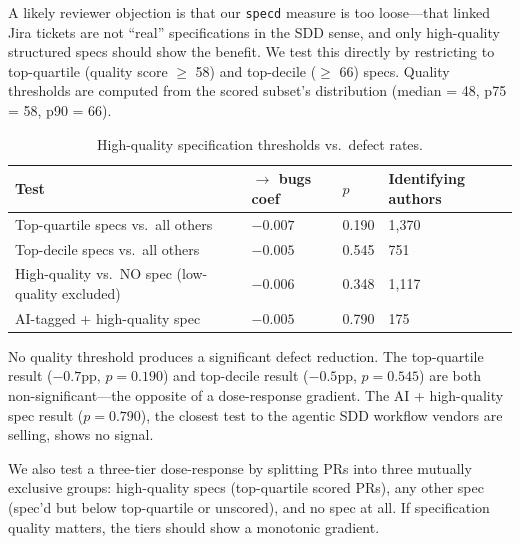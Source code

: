 \documentclass[a4paper,UKenglish,cleveref,autoref,thm-restate]{lipics-v2021}
\begin{document}
A likely reviewer objection is that our \texttt{specd} measure is too loose---that linked Jira tickets are not ``real'' specifications in the SDD sense, and only high-quality structured specs should show the benefit. We test this directly by restricting to top-quartile (quality score $\geq$ 58) and top-decile ($\geq$ 66) specs. Quality thresholds are computed from the scored subset's distribution (median = 48, p75 = 58, p90 = 66).

\begin{table}[t]
\centering
\caption{High-quality specification thresholds vs.\ defect rates.}
\label{tab:high-quality}
\begin{tabular}{@{}llll@{}}
\toprule
\textbf{Test} & \textbf{$\rightarrow$ bugs coef} & \textbf{$p$} & \textbf{Identifying authors} \\
\midrule
Top-quartile specs vs.\ all others & $-0.007$ & 0.190 & 1,370 \\
Top-decile specs vs.\ all others & $-0.005$ & 0.545 & 751 \\
High-quality vs.\ NO spec (low-quality excluded) & $-0.006$ & 0.348 & 1,117 \\
AI-tagged + high-quality spec & $-0.005$ & 0.790 & 175 \\
\bottomrule
\end{tabular}
\end{table}

No quality threshold produces a significant defect reduction. The top-quartile result ($-0.7$pp, $p = 0.190$) and top-decile result ($-0.5$pp, $p = 0.545$) are both non-significant---the opposite of a dose-response gradient. The AI + high-quality spec result ($p = 0.790$), the closest test to the agentic SDD workflow vendors are selling, shows no signal.

We also test a three-tier dose-response by splitting PRs into three mutually exclusive groups: high-quality specs (top-quartile scored PRs), any other spec (spec'd but below top-quartile or unscored), and no spec at all. If specification quality matters, the tiers should show a monotonic gradient.
\end{document}
